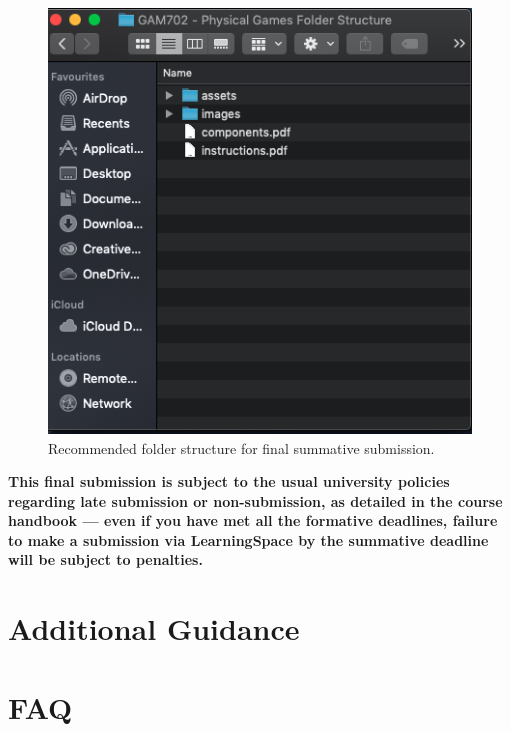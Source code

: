 \documentclass{../../fal_assignment}
\begin{document}
\begin{figure}[H]
	\begin{center}
		\includegraphics[height=0.4\textheight]{physical_games_folder_structure}
	\end{center}
	\caption{Recommended folder structure for final summative submission.}
	\label{fig:phyical_game_folder_structure}
\end{figure}

\textbf{This final submission is subject to the usual university policies regarding late submission or non-submission,
as detailed in the course handbook ---
even if you have met all the formative deadlines,
failure to make a submission via LearningSpace by the summative deadline will be subject to penalties.}

\section*{Additional Guidance}



\section*{FAQ}
\end{document}
